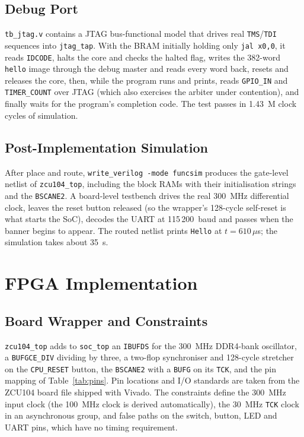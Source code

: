\documentclass[journal,10pt]{IEEEtran}
\newcommand{\reg}[1]{\texttt{#1}}
\begin{document}
\subsection{Debug Port}
\reg{tb\_jtag.v} contains a JTAG bus-functional model that drives real
\reg{TMS}/\reg{TDI} sequences into \reg{jtag\_tap}. With the BRAM initially
holding only \reg{jal x0,0}, it reads \reg{IDCODE}, halts the core and checks
the halted flag, writes the 382-word \reg{hello} image through the debug
master and reads every word back, resets and releases the core, then, while
the program runs and prints, reads \reg{GPIO\_IN} and \reg{TIMER\_COUNT}
over JTAG (which also exercises the arbiter under contention), and finally
waits for the program's completion code. The test passes in 1.43~M clock
cycles of simulation.

\subsection{Post-Implementation Simulation}
After place and route, \reg{write\_verilog -mode funcsim} produces the
gate-level netlist of \reg{zcu104\_top}, including the block RAMs with their
initialisation strings and the \reg{BSCANE2}. A board-level testbench drives
the real 300~MHz differential clock, leaves the reset button released (so the
wrapper's 128-cycle self-reset is what starts the SoC), decodes the UART at
115\,200~baud and passes when the banner begins to appear. The routed netlist
prints \reg{Hello} at $t = 610\,\mu$s; the simulation takes about 35~s.

\section{FPGA Implementation}\label{sec:impl}
\subsection{Board Wrapper and Constraints}
\reg{zcu104\_top} adds to \reg{soc\_top} an \reg{IBUFDS} for the 300~MHz
DDR4-bank oscillator, a \reg{BUFGCE\_DIV} dividing by three, a two-flop
synchroniser and 128-cycle stretcher on the \reg{CPU\_RESET} button, the
\reg{BSCANE2} with a \reg{BUFG} on its \reg{TCK}, and the pin mapping of
Table~\ref{tab:pins}. Pin locations and I/O standards are taken from the
ZCU104 board file shipped with Vivado. The constraints define the 300~MHz
input clock (the 100~MHz clock is derived automatically), the 30~MHz
\reg{TCK} clock in an asynchronous group, and false paths on the switch,
button, LED and UART pins, which have no timing requirement.
\end{document}
